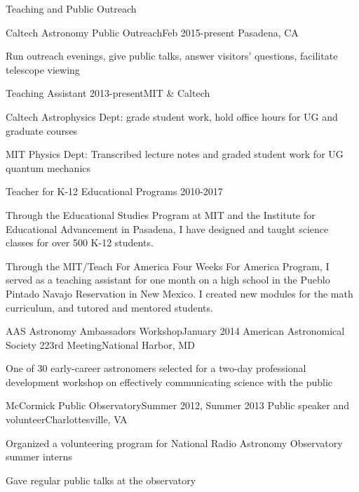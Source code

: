 \documentclass{resume} %
\begin{document}

\begin{rSection}{Teaching and Public Outreach}

  \begin{rSubsection}{Caltech Astronomy Public Outreach}{Feb 2015-present}
    {}{Pasadena, CA}
  \item Run outreach evenings, give public talks, answer visitors' questions,
    facilitate telescope viewing
  \end{rSubsection}

  \begin{rSubsection}{Teaching Assistant} 
    {2013-present}{}{MIT \& Caltech}
  \item Caltech Astrophysics Dept: grade student work, hold office hours 
    for UG and graduate courses
  \item MIT Physics Dept: Transcribed lecture notes and graded student work
    for UG quantum mechanics
  \end{rSubsection}

  \begin{rSubsection}{Teacher for K-12 Educational Programs}
    {2010-2017}{}{}
  \item Through the Educational Studies Program at MIT and the 
    Institute for Educational Advancement in Pasadena, 
    I have designed and taught science
    classes for over 500 K-12 students.
  \item Through the MIT/Teach For America Four Weeks For America Program,
    I served as a teaching assistant for one month on a high school in
    the Pueblo Pintado Navajo Reservation in New Mexico. I created
    new modules for the math curriculum, and tutored and mentored students.
  \end{rSubsection}

  \begin{rSubsection}{AAS Astronomy Ambassadors Workshop}{January 2014}
  {American Astronomical Society 223rd Meeting}{National Harbor, MD}
  \item One of 30 early-career astronomers selected for a two-day professional development workshop on effectively communicating science with the public
  \end{rSubsection}

  \begin{rSubsection}{McCormick Public Observatory}{Summer 2012, Summer 2013}
    {Public speaker and volunteer}{Charlottesville, VA}
  \item Organized a volunteering program for National Radio Astronomy Observatory summer interns
  \item Gave regular public talks at the observatory
  \end{rSubsection}

\end{rSection}
\end{document}
